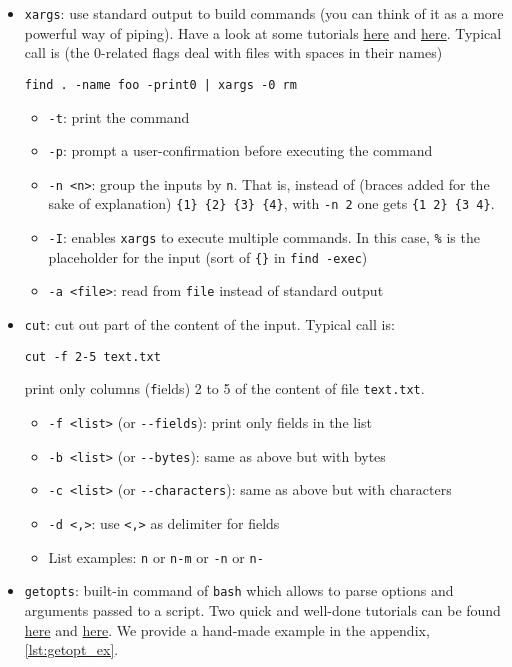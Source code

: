 \documentclass[a4paper,12pt,%
              final%
              ]{article}
\begin{document}
\begin{itemize}
  \item \texttt{xargs}: use standard output to build commands (you can think of it as a more powerful way of piping). Have a look at some tutorials \href{https://shapeshed.com/unix-xargs/}{here} and \href{https://www.thegeekstuff.com/2013/12/xargs-examples/}{here}. Typical call is (the 0-related flags deal with files with spaces in their names)
\begin{verbatim}
find . -name foo -print0 | xargs -0 rm
\end{verbatim}
    \begin{itemize}
      \item \texttt{-t}: print the command
      \item \texttt{-p}: prompt a user-confirmation before executing the command
      \item \texttt{-n <n>}: group the inputs by \texttt{n}. That is, instead of (braces added for the sake of explanation) \verb|{1} {2} {3} {4}|, with \texttt{-n 2} one gets \verb|{1 2} {3 4}|.
      \item \texttt{-I}: enables \texttt{xargs} to execute multiple commands. In this case, \verb|%| is the placeholder for the input (sort of \verb|{}| in \verb|find -exec|)
      \item \texttt{-a <file>}: read from \texttt{file} instead of standard output
    \end{itemize}
  \item \texttt{cut}: cut out part of the content of the input. Typical call is:
\begin{verbatim}
cut -f 2-5 text.txt
\end{verbatim}
    print only columns (\texttt{f}ields) 2 to 5 of the content of file \verb|text.txt|.
    \begin{itemize}
      \item \verb|-f <list>| (or \verb|--fields|): print only fields in the list
      \item \verb|-b <list>| (or \verb|--bytes|): same as above but with bytes
      \item \verb|-c <list>| (or \verb|--characters|): same as above but with characters
      \item \verb|-d <,>|: use \verb|<,>| as delimiter for fields
      \item List examples: \texttt{n} or \texttt{n-m} or \texttt{-n} or \texttt{n-}
    \end{itemize}
  \item \texttt{getopts}: built-in command of \texttt{bash} which allows to parse options and arguments passed to a script. Two quick and well-done tutorials can be found \href{https://www.computerhope.com/unix/bash/getopts.htm}{here} and \href{https://sookocheff.com/post/bash/parsing-bash-script-arguments-with-shopts/}{here}. We provide a hand-made example in the appendix, \autoref{lst:getopt_ex}.

\end{itemize}
\end{document}
